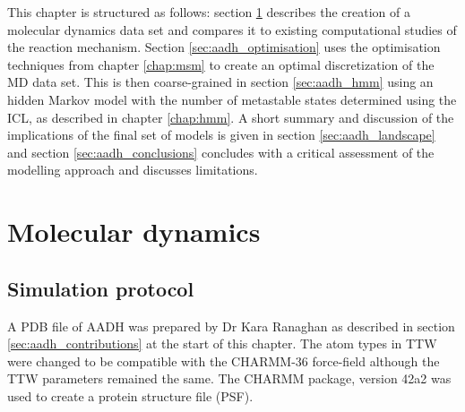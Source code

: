 This chapter is structured as follows: section \ref{sec:aadh_md} describes the creation of a molecular dynamics data set and compares it to existing computational studies of the reaction mechanism. Section \ref{sec:aadh_optimisation} uses the optimisation techniques from chapter \ref{chap:msm} to create an optimal discretization of the MD data set. This is then coarse-grained in section \ref{sec:aadh_hmm} using an hidden Markov model with the number of metastable states determined using the ICL, as described in chapter \ref{chap:hmm}. A short summary and discussion of the implications of the final set of models is given in section \ref{sec:aadh_landscape} and section \ref{sec:aadh_conclusions} concludes with a critical assessment of the modelling approach and discusses limitations. 

\section{Molecular dynamics}\label{sec:aadh_md}

\subsection{Simulation protocol}
A PDB file of AADH was prepared by Dr Kara Ranaghan as described in section \ref{sec:aadh_contributions} at the start of this chapter. The atom types in TTW were changed to be compatible with the CHARMM-36 \cite{huangCHARMM36AllatomAdditive2013} force-field although the TTW parameters remained the same. The CHARMM package, version 42a2 \cite{brooksCHARMMBiomolecularSimulation2009} was used to create a protein structure file (PSF). 

